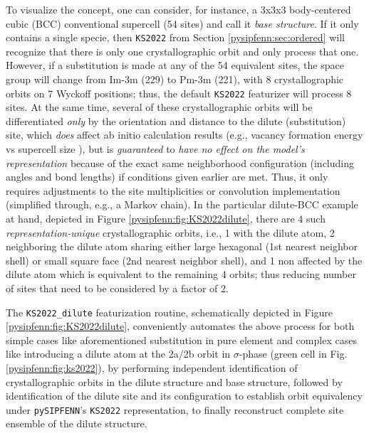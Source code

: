 To visualize the concept, one can consider, for instance, a 3x3x3 body-centered cubic (BCC) conventional supercell (54 sites) and call it \textit{base structure}. If it only contains a single specie, then \texttt{KS2022} from Section \ref{pysipfenn:sec:ordered} will recognize that there is only one crystallographic orbit and only process that one. However, if a substitution is made at any of the 54 equivalent sites, the space group will change from Im-3m (229) to Pm-3m (221), with 8 crystallographic orbits on 7 Wyckoff positions; thus, the default \texttt{KS2022} featurizer will process 8 sites. 
At the same time, several of these crystallographic orbits will be differentiated \emph{only} by the orientation and distance to the dilute (substitution) site, which \emph{does} affect ab initio calculation results (e.g., vacancy formation energy vs supercell size \cite{Hargather2022ANi}), but is \emph{guaranteed} to \emph{have no effect on the model's representation} because of the exact same neighborhood configuration (including angles and bond lengths) if conditions given earlier are met. Thus, it only requires adjustments to the site multiplicities or convolution implementation (simplified through, e.g., a Markov chain). In the particular dilute-BCC example at hand, depicted in Figure \ref{pysipfenn:fig:KS2022dilute}, there are 4 such \emph{representation-unique} crystallographic orbits, i.e., 1 with the dilute atom, 2 neighboring the dilute atom sharing either large hexagonal (1st nearest neighbor shell) or small square face (2nd nearest neighbor shell), and 1 non affected by the dilute atom which is equivalent to the remaining 4 orbits; thus reducing number of sites that need to be considered by a factor of 2.

The \texttt{KS2022\_dilute} featurization routine, schematically depicted in Figure \ref{pysipfenn:fig:KS2022dilute}, conveniently automates the above process for both simple cases like aforementioned substitution in pure element and complex cases like introducing a dilute atom at the 2a/2b orbit in $\sigma$-phase (green cell in Fig. \ref{pysipfenn:fig:ks2022}), by performing independent identification of crystallographic orbits in the dilute structure and base structure, followed by identification of the dilute site and its configuration to establish orbit equivalency under \texttt{pySIPFENN}'s \texttt{KS2022} representation, to finally reconstruct complete site ensemble of the dilute structure.

